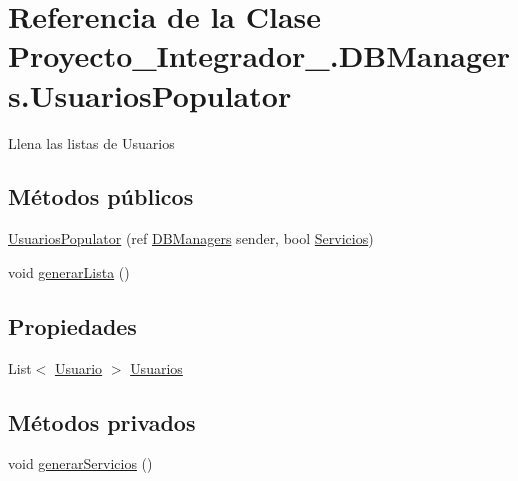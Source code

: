 \hypertarget{class_proyecto___integrador__3_1_1_d_b_managers_1_1_usuarios_populator}{\section{Referencia de la Clase Proyecto\-\_\-\-Integrador\-\_.\-D\-B\-Managers.\-Usuarios\-Populator}
\label{class_proyecto___integrador__3_1_1_d_b_managers_1_1_usuarios_populator}
}


Llena las listas de Usuarios  


\subsection*{Métodos públicos}
\begin{DoxyCompactItemize}
\item 
\hyperlink{class_proyecto___integrador__3_1_1_d_b_managers_1_1_usuarios_populator_ac6ee60b63a29d31bc9b7753f953c9298}{Usuarios\-Populator} (ref \hyperlink{class_proyecto___integrador__3_1_1_d_b_managers}{D\-B\-Managers} sender, bool \hyperlink{class_proyecto___integrador__3_1_1_d_b_managers_1_1_usuarios_populator_a6986794b35361485b9507cdccf8e8abe}{Servicios})
\item 
void \hyperlink{class_proyecto___integrador__3_1_1_d_b_managers_1_1_usuarios_populator_ae57a31fec3cd4b7260c4b53c2674ce4f}{generar\-Lista} ()
\end{DoxyCompactItemize}
\subsection*{Propiedades}
\begin{DoxyCompactItemize}
\item 
List$<$ \hyperlink{class_proyecto___integrador__3_1_1_tipos_dato_1_1_usuario}{Usuario} $>$ \hyperlink{class_proyecto___integrador__3_1_1_d_b_managers_1_1_usuarios_populator_adbf816391dedd5522f050c53a22319da}{Usuarios}
\end{DoxyCompactItemize}
\subsection*{Métodos privados}
\begin{DoxyCompactItemize}
\item 
void \hyperlink{class_proyecto___integrador__3_1_1_d_b_managers_1_1_usuarios_populator_a916fea74331c8233f2af0d272f59ccea}{generar\-Servicios} ()
\end{DoxyCompactItemize}
